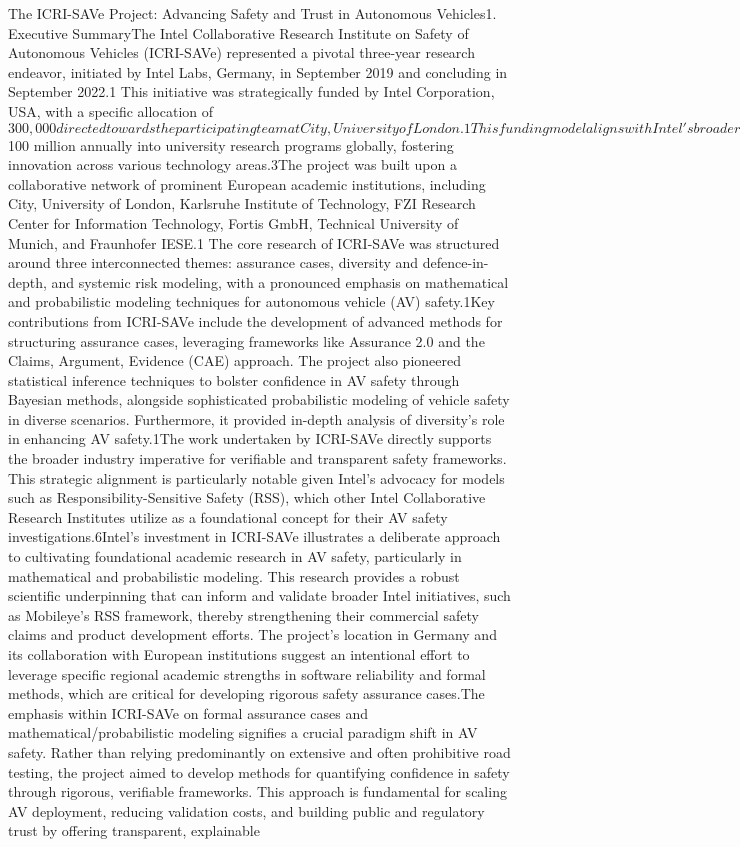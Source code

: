 The ICRI-SAVe Project: Advancing Safety and Trust in Autonomous Vehicles1. Executive SummaryThe Intel Collaborative Research Institute on Safety of Autonomous Vehicles (ICRI-SAVe) represented a pivotal three-year research endeavor, initiated by Intel Labs, Germany, in September 2019 and concluding in September 2022.1 This initiative was strategically funded by Intel Corporation, USA, with a specific allocation of $300,000 directed towards the participating team at City, University of London.1 This funding model aligns with Intel's broader commitment to investing approximately $100 million annually into university research programs globally, fostering innovation across various technology areas.3The project was built upon a collaborative network of prominent European academic institutions, including City, University of London, Karlsruhe Institute of Technology, FZI Research Center for Information Technology, Fortis GmbH, Technical University of Munich, and Fraunhofer IESE.1 The core research of ICRI-SAVe was structured around three interconnected themes: assurance cases, diversity and defence-in-depth, and systemic risk modeling, with a pronounced emphasis on mathematical and probabilistic modeling techniques for autonomous vehicle (AV) safety.1Key contributions from ICRI-SAVe include the development of advanced methods for structuring assurance cases, leveraging frameworks like Assurance 2.0 and the Claims, Argument, Evidence (CAE) approach. The project also pioneered statistical inference techniques to bolster confidence in AV safety through Bayesian methods, alongside sophisticated probabilistic modeling of vehicle safety in diverse scenarios. Furthermore, it provided in-depth analysis of diversity's role in enhancing AV safety.1The work undertaken by ICRI-SAVe directly supports the broader industry imperative for verifiable and transparent safety frameworks. This strategic alignment is particularly notable given Intel's advocacy for models such as Responsibility-Sensitive Safety (RSS), which other Intel Collaborative Research Institutes utilize as a foundational concept for their AV safety investigations.6Intel's investment in ICRI-SAVe illustrates a deliberate approach to cultivating foundational academic research in AV safety, particularly in mathematical and probabilistic modeling. This research provides a robust scientific underpinning that can inform and validate broader Intel initiatives, such as Mobileye's RSS framework, thereby strengthening their commercial safety claims and product development efforts. The project's location in Germany and its collaboration with European institutions suggest an intentional effort to leverage specific regional academic strengths in software reliability and formal methods, which are critical for developing rigorous safety assurance cases.The emphasis within ICRI-SAVe on formal assurance cases and mathematical/probabilistic modeling signifies a crucial paradigm shift in AV safety. Rather than relying predominantly on extensive and often prohibitive road testing, the project aimed to develop methods for quantifying confidence in safety through rigorous, verifiable frameworks. This approach is fundamental for scaling AV deployment, reducing validation costs, and building public and regulatory trust by offering transparent, explainable 